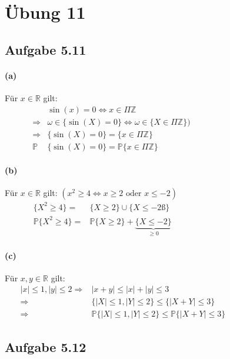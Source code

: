 \documentclass[10pt, a4paper]{article}
\begin{document}
\section{Übung 11}
\subsection{Aufgabe 5.11}
\paragraph{(a)}
Für $x\in \mathbb{R}$ gilt:
\begin{align*}
	&\sin(x)=0\Leftrightarrow x\in\Pi\mathbb{Z}	\hspace{200pt}\\ \Rightarrow&\omega\in\{\sin(X)=0\}\Leftrightarrow\omega\in\{X\in\Pi\mathbb{Z}\})	\\
	\Rightarrow&\{\sin(X)=0\}=\{x\in\Pi\mathbb{Z}\}	\\
	\mathbb{P}&\{\sin(X)=0\}=\mathbb{P}\{x\in\Pi\mathbb{Z} \}
\end{align*}


\paragraph{(b)}Für $x\in\mathbb{R}$ gilt: $(x^{2}\geq4\Leftrightarrow x\geq2\text{ oder }x\leq-2)$
\begin{align*}
	\{X^{2}\geq4\}=&\{X\geq2\}\cup\{X\leq-2 ß\}	\hspace{150pt}\\
	\mathbb{P}\{X^{2}\geq4\}=&\mathbb{P}\{X\geq2\}+\underbrace{\{X\leq-2\}}_{\geq0}
\end{align*}


\paragraph{(c)}
Für $x,y\in\mathbb{R}$ gilt:
\begin{align*}
	|x|\leq1,|y|\leq2\Rightarrow&|x+y|\leq|x|+|y|\leq3	\hspace{170pt}\\
	\Rightarrow&\{|X|\leq1,|Y|\leq2 \}\leq\{|X+Y|\leq3\}	\\
	\Rightarrow&\mathbb{P}\{|X|\leq1,|Y|\leq2 \}\leq\mathbb{P}\{|X+Y|\leq3\}
\end{align*} 


\subsection{Aufgabe 5.12}
\end{document}
